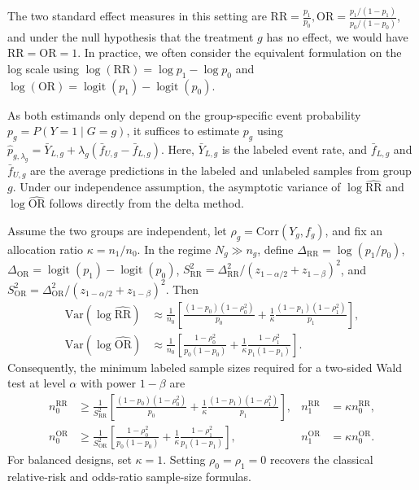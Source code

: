 \documentclass[12pt]{article}
\newcommand{\Var}{\mathrm{Var}}
\newcommand{\Corr}{\mathrm{Corr}}
\newcommand{\wh}{\widehat}
\begin{document}
The two standard effect measures in this setting are
$\mathrm{RR} = \frac{p_1}{p_0}, \mathrm{OR} = \frac{p_1/(1-p_1)}{p_0/(1-p_0)}$,
and under the null hypothesis that the treatment $g$ has no effect, we would have $\mathrm{RR}=\mathrm{OR} = 1$. In practice, we often consider the equivalent formulation on the log scale using
$\log(\mathrm{RR}) = \log p_1 - \log p_0$ and
$\log(\mathrm{OR}) = \operatorname{logit}(p_1) - \operatorname{logit}(p_0)$. 

As both estimands only depend on the group-specific event probability
$p_g = P(Y=1 \mid G=g)$, it suffices to estimate $p_g$ using
$\wh{p}_{g,\lambda_g} = \bar{Y}_{L,g} +
\lambda_g(\bar{f}_{U,g} - \bar{f}_{L,g})$.
Here, $\bar{Y}_{L,g}$ is the labeled event rate, and $\bar{f}_{L,g}$ and
$\bar{f}_{U,g}$ are the average predictions in the labeled and unlabeled
samples from group $g$.  Under our independence assumption, the
asymptotic variance of $\log \widehat{\mathrm{RR}}$ and
$\log \widehat{\mathrm{OR}}$ follows directly from the delta method.

\begin{proposition}\label{prop:2x2-n}
Assume the two groups are independent, let $\rho_g = \Corr(Y_g, f_g)$,
and fix an allocation ratio $\kappa = n_1/n_0$. In the regime
$N_g \gg n_g$, define
$\Delta_{\mathrm{RR}} = \log(p_1/p_0)$,
$\Delta_{\mathrm{OR}} = \operatorname{logit}(p_1) -
\operatorname{logit}(p_0)$,
$S_{\mathrm{RR}}^2 =
\Delta_{\mathrm{RR}}^2/(z_{1-\alpha/2}+z_{1-\beta})^2$, and
$S_{\mathrm{OR}}^2 =
\Delta_{\mathrm{OR}}^2/(z_{1-\alpha/2}+z_{1-\beta})^2$. Then
\begin{align*}
\Var(\log \widehat{\mathrm{RR}})
&\approx
\frac{1}{n_0}
\left[
\frac{(1-p_0)(1-\rho_0^2)}{p_0}
+
\frac{1}{\kappa}\frac{(1-p_1)(1-\rho_1^2)}{p_1}
\right], \\
\Var(\log \widehat{\mathrm{OR}})
&\approx
\frac{1}{n_0}
\left[
\frac{1-\rho_0^2}{p_0(1-p_0)}
+
\frac{1}{\kappa}\frac{1-\rho_1^2}{p_1(1-p_1)}
\right].
\end{align*}
Consequently, the minimum labeled sample sizes required for a two-sided Wald
test at level $\alpha$ with power $1-\beta$ are
\begin{align*}
n_0^{\mathrm{RR}}
&\ge
\frac{1}{S_{\mathrm{RR}}^2}
\left[
\frac{(1-p_0)(1-\rho_0^2)}{p_0}
+
\frac{1}{\kappa}\frac{(1-p_1)(1-\rho_1^2)}{p_1}
\right],
&
n_1^{\mathrm{RR}} &= \kappa n_0^{\mathrm{RR}}, \\
n_0^{\mathrm{OR}}
&\ge
\frac{1}{S_{\mathrm{OR}}^2}
\left[
\frac{1-\rho_0^2}{p_0(1-p_0)}
+
\frac{1}{\kappa}\frac{1-\rho_1^2}{p_1(1-p_1)}
\right],
&
n_1^{\mathrm{OR}} &= \kappa n_0^{\mathrm{OR}}.
\end{align*}
For balanced designs, set $\kappa = 1$.  Setting $\rho_0 = \rho_1 = 0$
recovers the classical relative-risk and odds-ratio sample-size
formulas.
\end{proposition}
\end{document}
